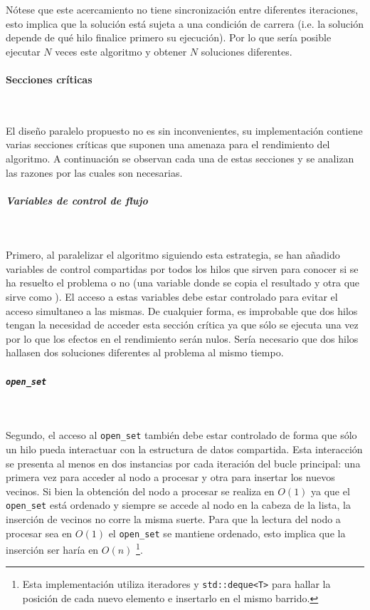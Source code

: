 \begin{notebox}
    Nótese que este acercamiento no tiene sincronización entre diferentes iteraciones,
    esto implica que la solución está sujeta a una condición de carrera
    (i.e. la solución depende de qué hilo finalice primero su ejecución).
    Por lo que sería posible ejecutar $N$ veces este algoritmo y obtener
    $N$ soluciones diferentes.
\end{notebox}

\paragraph{Secciones críticas}~

El diseño paralelo propuesto no es sin inconvenientes,
su implementación contiene varias secciones críticas que suponen
una amenaza para el rendimiento del algoritmo.
A continuación se observan cada una de estas secciones y se
analizan las razones por las cuales son necesarias.

\subparagraph{Variables de control de flujo}~

Primero, al paralelizar el algoritmo siguiendo esta estrategia,
se han añadido variables de control compartidas por todos
los hilos que sirven para conocer si se ha resuelto el problema
o no (una variable donde se copia el resultado y
otra que sirve como ).
El acceso a estas variables debe estar controlado
para evitar el acceso simultaneo a las mismas.
De cualquier forma, es improbable que dos hilos tengan
la necesidad de acceder esta sección crítica ya que sólo
se ejecuta una vez por lo que los efectos en el rendimiento serán nulos.
Sería necesario que dos hilos hallasen dos soluciones diferentes al
problema al mismo tiempo.

\subparagraph{\lstinline{open_set}}~

Segundo, el acceso al \lstinline{open_set} también 
debe estar controlado de forma que sólo un hilo
pueda interactuar con la estructura de datos compartida.
Esta interacción se presenta al menos en dos instancias por
cada iteración del bucle principal:
una primera vez para acceder al nodo a procesar
y otra para insertar los nuevos vecinos.
Si bien la obtención del nodo a procesar se realiza en $O(1)$
ya que el \lstinline{open_set} está ordenado y
siempre se accede al nodo en la cabeza de la lista,
la inserción de vecinos no corre la misma suerte.
Para que la lectura del nodo a procesar sea en $O(1)$
el \lstinline{open_set} se mantiene ordenado,
esto implica que la inserción ser haría en $O(n)$
\footnote{Esta implementación utiliza iteradores y
\lstinline{std::deque<T>} para hallar la posición de cada
nuevo elemento e insertarlo en el mismo barrido.}.

